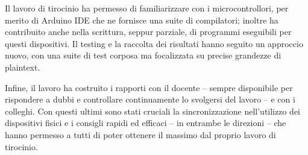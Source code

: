 \documentclass[a4paper, 12pt, italian]{extarticle}
\begin{document}
Il lavoro di tirocinio ha permesso di familiarizzare con i microcontrollori, per merito di Arduino IDE che ne fornisce una suite di compilatori; inoltre ha contribuito anche nella scrittura, seppur parziale, di programmi eseguibili per questi dispositivi. Il testing e la raccolta dei risultati hanno seguito un approccio nuovo, con una suite di test corposa ma focalizzata su precise grandezze di plaintext.

Infine, il lavoro ha costruito i rapporti con il docente -- sempre disponibile per rispondere a dubbi e controllare continuamente lo svolgersi del lavoro -- e con i colleghi. Con questi ultimi sono stati cruciali la sincronizzazione nell'utilizzo dei dispositivi fisici e i consigli rapidi ed efficaci -- in entrambe le direzioni -- che hanno permesso a tutti di poter ottenere il massimo dal proprio lavoro di tirocinio.

\section{\bibname}

\nocite{*}
\printbibliography[heading=none]
\end{document}
